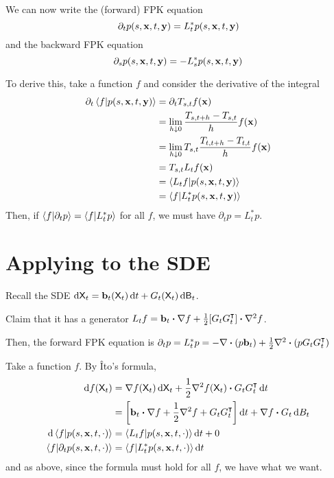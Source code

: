 \documentclass[notes]{agony}
\newcommand{\rv}{\mathsf}
\newcommand{\B}{\rv{B}}
\newcommand{\X}{\rv{X}}
\newcommand{\x}{\vb{x}}
\newcommand{\y}{\vb{y}}
\begin{document}
We can now write the (forward) FPK equation
\[ \partial_t p(s,\x,t,\y) = L_t^* p(s,\x,t,\y) \]
and the backward FPK equation
\[ \partial_s p(s,\x,t,\y) = -L_s^* p(s,\x,t,\y) \]
\begin{prf}
	To derive this, take a function $f$ and consider the derivative of the integral
	\begin{align*}
		\partial_t \ip{f}{p(s,\x,t,\y)}
		 & = \partial_t T_{s,t}f(\x)                                        \\
		 & = \lim_{h\downarrow 0} \frac{T_{s,t+h} - T_{s,t}}{h}f(\x)        \\
		 & = \lim_{h\downarrow 0} T_{s,t}\frac{T_{t,t+h} - T_{t,t}}{h}f(\x) \\
		 & = T_{s,t}L_t f(\x)                                               \\
		 & = \ip{L_t f}{p(s,\x,t,\y)}                                       \\
		 & = \ip{f}{L_t^* p(s,\x,t,\y)}
	\end{align*}
	Then, if $\ip{f}{\partial_t p} = \ip{f}{L_t^* p}$ for all $f$,
	we must have $\partial_t p = L_t^* p$.
\end{prf}

\section{Applying to the SDE}

Recall the SDE $\dd{\X_t} = \vb b_t(\X_t) \dd{t} + G_t(\X_t)\dd{\B_t}$.

Claim that it has a generator $L_tf = \vb b_t \vdot \nabla f + \frac12[G_t G_t\trans]\vdot \nabla^2 f$.

Then, the forward FPK equation is $\partial_t p = L_t^* p = -\nabla \vdot (p\vb b_t) + \frac12 \nabla^2 \vdot (pG_tG_t\trans)$

\begin{prf}
	Take a function $f$. By Îto's formula,
	\begin{align*}
		\dd{f(\X_t)}
		 & = \nabla f(\X_t) \dd{\X_t} + \frac12\nabla^2 f(\X_t) \vdot G_tG_t\trans \dd{t}                         \\
		 & = \qty[\vb b_t \vdot \nabla f + \frac12 \nabla^2 f + G_tG_t\trans]\dd{t} + \nabla f \vdot G_t \dd{B_t} \\
		\dd{\ip{f}{p(s,\x,t,\cdot)}}
		 & = \ip{L_t f}{p(s,\x,t,\cdot)}\dd{t} + 0                                                                \\
		\ip{f}{\partial_t p(s,\x,t,\cdot)}
		 & = \ip{f}{L_t^* p(s,\x,t,\cdot)}\dd{t}
	\end{align*}
	and as above, since the formula must hold for all $f$,
	we have what we want.
\end{prf}
\end{document}
